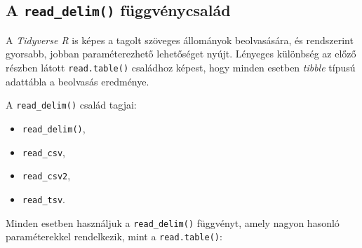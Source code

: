 \documentclass[
]{book}
\providecommand{\tightlist}{%
  \setlength{\itemsep}{0pt}\setlength{\parskip}{0pt}}
\begin{document}
\hypertarget{a-read_delim-fuxfcggvuxe9nycsaluxe1d}{%
\subsection{\texorpdfstring{A \texttt{read\_delim()} függvénycsalád}{A read\_delim() függvénycsalád}}\label{a-read_delim-fuxfcggvuxe9nycsaluxe1d}}

A \emph{Tidyverse R} is képes a tagolt szöveges állományok beolvasására, és rendszerint gyorsabb, jobban paraméterezhető lehetőséget nyújt. Lényeges különbség az előző részben látott \texttt{read.table()} családhoz képest, hogy minden esetben \emph{tibble} típusú adattábla a beolvasás eredménye.

A \texttt{read\_delim()} család tagjai:

\begin{itemize}
\tightlist
\item
  \texttt{read\_delim()},
\item
  \texttt{read\_csv},
\item
  \texttt{read\_csv2},
\item
  \texttt{read\_tsv}.
\end{itemize}

Minden esetben használjuk a \texttt{read\_delim()} függvényt, amely nagyon hasonló paraméterekkel rendelkezik, mint a \texttt{read.table()}:
\end{document}
